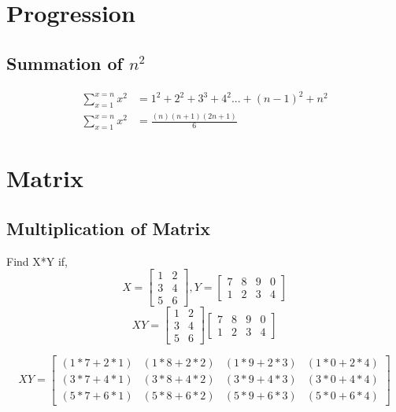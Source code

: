 \documentclass{report}
\begin{document}
    \section{Progression}
    \subsection{Summation of $n^2$ }
        \large
        \begin{align*}
        \sum_{x=1}^{x=n} x^2 &= 1^2 + 2^2 + 3^3 + 4^2 ... + (n-1)^2 + n^2 \\
        \sum_{x=1}^{x=n} x^2 &= \frac{(n)(n+1)(2n+1)}{6}
        \end{align*}
    
    \section{Matrix}
    \subsection{Multiplication of Matrix}
        \Large
        Find X*Y if,
        \large
        $$
        X = 
        \begin{bmatrix}
            1 & 2 \\
            3 & 4 \\
            5 & 6 
        \end{bmatrix}
        , Y =
        \begin{bmatrix}
            7 & 8 & 9 & 0 \\
            1 & 2 & 3 & 4
        \end{bmatrix}
        $$
        $$
        XY = 
        \begin{bmatrix}
            1 & 2 \\
            3 & 4 \\
            5 & 6 
        \end{bmatrix}
        \begin{bmatrix}
            7 & 8 & 9 & 0 \\
            1 & 2 & 3 & 4
        \end{bmatrix}
        $$

        $$
         XY =
        \begin{bmatrix}
            (1*7 + 2*1) & (1*8+2*2) & (1*9+2*3) & (1*0+2*4) \\
            (3*7 + 4*1) & (3*8+4*2) & (3*9+4*3) & (3*0+4*4) \\
            (5*7 + 6*1) & (5*8+6*2) & (5*9+6*3) & (5*0+6*4) 
        \end{bmatrix}
        $$
\end{document}
